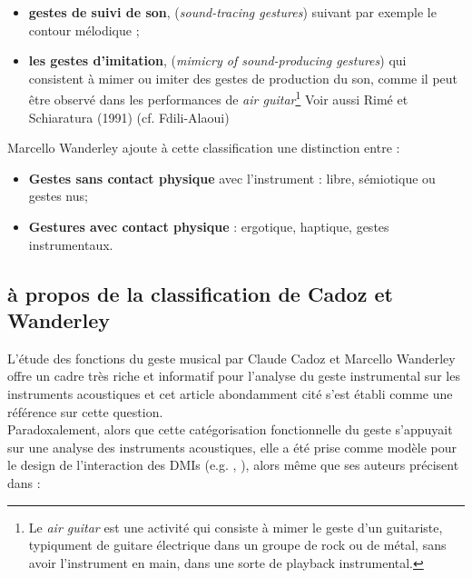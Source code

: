 \begin{itemize}[noitemsep]
	\vspace{-0.5em}
	\begin{itemize}[noitemsep]
		\item \textbf{gestes de suivi de son}, (\textit{sound-tracing gestures}) suivant par exemple le contour mélodique \cite{godoy_exploring_2006};
		\item \textbf{les gestes d'imitation}, (\textit{mimicry of sound-producing gestures}) qui consistent à mimer ou imiter des gestes de production du son, comme il peut être observé dans les performances de \textit{air guitar}\footnote{Le \textit{air guitar} est une activité qui consiste à mimer le geste d’un guitariste, typiqument de guitare électrique dans un groupe de rock ou de métal, sans avoir l’instrument en main, dans une sorte de playback instrumental.} \cite{godoy_playing_2005} Voir aussi  Rimé et Schiaratura (1991) (cf. Fdili-Alaoui)
	\end{itemize}
\end{itemize}


\noindent Marcello Wanderley ajoute à cette classification une distinction entre :
\vspace{-1em}
\begin{itemize}[noitemsep]
\item \textbf{Gestes sans contact physique} avec l'instrument : libre, sémiotique ou gestes nus;
\item \textbf{Gestures avec contact physique} : ergotique, haptique, gestes instrumentaux.
\end{itemize}

\subsection{à propos de la classification de Cadoz et Wanderley}

L'étude des fonctions du geste musical par Claude Cadoz et Marcello Wanderley offre un cadre très riche et informatif pour l'analyse du geste instrumental sur les instruments acoustiques et cet article abondamment cité s'est établi comme une référence sur cette question.\\
Paradoxalement, alors que cette catégorisation fonctionnelle du geste s'appuyait sur une analyse des instruments acoustiques, elle a été prise comme modèle pour le design de l'interaction des \glspl{DMI} (e.g. \cite{arfib_strategies_2002}, \cite{schwarz_sound_2012}), alors même que ses auteurs précisent dans \cite{cadoz_gesture_2000}:\\

